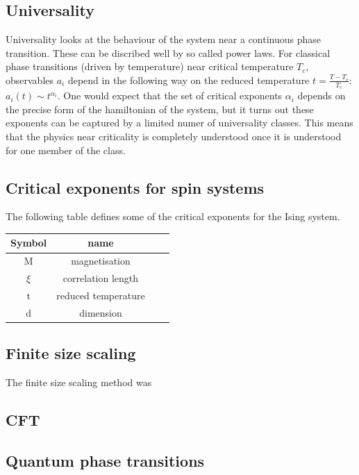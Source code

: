 \subsection{Universality}

Universality looks at the behaviour of the system near a continuous phase transition. These can be discribed well by so called power laws. For classical phase transitions (driven by temperature) near critical temperature $T_c$, observables $a_i$ depend in the following way on the reduced temperature $t=\frac{T-T_c}{T_c}$: $ a_i(t) \sim t^{\alpha_i}$. One would expect that the set of critical exponents ${\alpha_i}$ depends on the precise form of the hamiltonian of the system, but it turns out these exponents can be captured by a limited numer of universality classes. This means that the physics near criticality is completely understood once it is understood for one member of the class.

\subsection{Critical exponents for spin systems}
The following table defines some of the critical exponents for the Ising system.

\begin{table}[h!]
    \centering
    \begin{tabular}{c c c c}
        Symbol & name                \\
        \hline
        M      & magnetisation       \\
        $\xi$  & correlation length  \\
        t      & reduced temperature \\
        d      & dimension           \\
    \end{tabular}
\end{table}

\subsection{Finite size scaling}

The finite size scaling method was

\subsection{CFT}


\subsection{Quantum phase transitions}


